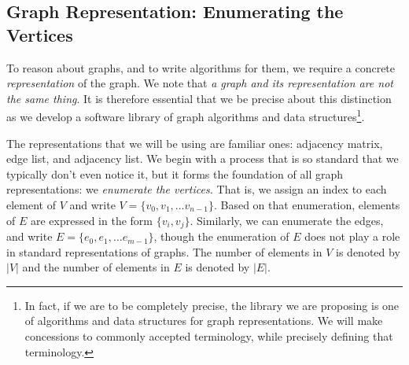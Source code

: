 \subsection{Graph Representation: Enumerating the Vertices}

To reason about graphs, and to write algorithms for them, we require a concrete \emph{representation} of the graph.
We note that \emph{a graph and its representation are not the same thing}.  It is therefore essential
that we be precise about this distinction as we develop a software library of graph
algorithms and data structures\footnote{In fact, if we are to be completely precise, the library we are
proposing is one of algorithms and data structures for graph representations.  We will make concessions
to commonly accepted terminology, while precisely defining that terminology.}.

The representations that we will be using are familiar ones: adjacency matrix, edge list, and adjacency list.
We begin with a process that is so standard that we typically don't even notice it, but it forms
the foundation of all graph representations: we \emph{enumerate the vertices.}  That is, we assign an
index to each element of $V$ and write $V = \{v_0, v_1, \ldots v_{n-1}\}$.  Based on that enumeration,
elements of $E$ are expressed in the form $\{v_i, v_j\}$.  Similarly, we can enumerate the edges, and write  
$E = \{ e_0, e_1, \ldots e_{m-1}\}$, though the enumeration of $E$ does not play a role in standard
representations of graphs.
%
The number of elements in $V$ is denoted by $|V|$ and the number of elements in $E$ is denoted by $|E|$.

